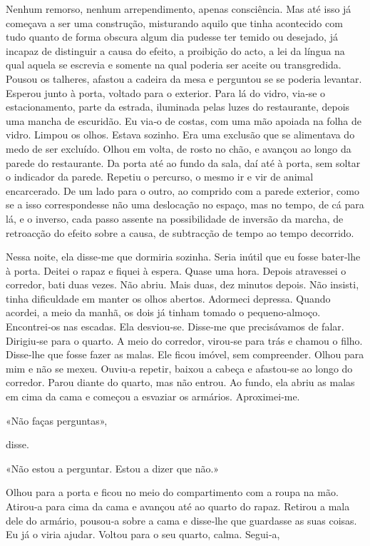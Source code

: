 Nenhum remorso, nenhum arrependimento, apenas consciência. Mas até isso
já começava a ser uma construção, misturando aquilo que tinha acontecido
com tudo quanto de forma obscura algum dia pudesse ter temido ou
desejado, já incapaz de distinguir a causa do efeito, a proibição do
acto, a lei da língua na qual aquela se escrevia e somente na qual
poderia ser aceite ou transgredida. Pousou os talheres, afastou a
cadeira da mesa e perguntou se se poderia levantar. Esperou junto à
porta, voltado para o exterior. Para lá do vidro, via­‑se o
estacionamento, parte da estrada, iluminada pelas luzes do restaurante,
depois uma mancha de escuridão. Eu via­‑o de costas, com uma mão apoiada
na folha de vidro. Limpou os olhos. Estava sozinho. Era uma exclusão que
se alimentava do medo de ser excluído. Olhou em volta, de rosto no chão,
e avançou ao longo da parede do restaurante. Da porta até ao fundo da
sala, daí até à porta, sem soltar o indicador da parede. Repetiu o
percurso, o mesmo ir e vir de animal encarcerado. De um lado para o
outro, ao comprido com a parede exterior, como se a isso correspondesse
não uma deslocação no espaço, mas no tempo, de cá para lá, e o inverso,
cada passo assente na possibilidade de inversão da marcha, de retroacção
do efeito sobre a causa, de subtracção de tempo ao tempo decorrido.

Nessa noite, ela disse­‑me que dormiria sozinha. Seria inútil que eu
fosse bater­‑lhe à porta. Deitei o rapaz e fiquei à espera. Quase uma
hora. Depois atravessei o corredor, bati duas vezes. Não abriu. Mais
duas, dez minutos depois. Não insisti, tinha dificuldade em manter os
olhos abertos. Adormeci depressa. Quando acordei, a meio da manhã, os
dois já tinham tomado o pequeno­‑almoço. Encontrei­‑os nas escadas. Ela
desviou­‑se. Disse­‑me que precisávamos de falar. Dirigiu­‑se para o
quarto. A meio do corredor, virou­‑se para trás e chamou o filho.
Disse­‑lhe que fosse fazer as malas. Ele ficou imóvel, sem compreender.
Olhou para mim e não se mexeu. Ouviu­‑a repetir, baixou a cabeça e
afastou­‑se ao longo do corredor. Parou diante do quarto, mas não
entrou. Ao fundo, ela abriu as malas em cima da cama e começou a
esvaziar os armários. Aproximei­‑me.

«Não faças perguntas»,

disse.

«Não estou a perguntar. Estou a dizer que não.»

Olhou para a porta e ficou no meio do compartimento com a roupa na mão.
Atirou­‑a para cima da cama e avançou até ao quarto do rapaz. Retirou a
mala dele do armário, pousou­‑a sobre a cama e disse­‑lhe que guardasse
as suas coisas. Eu já o viria ajudar. Voltou para o seu quarto, calma.
Segui­‑a,


